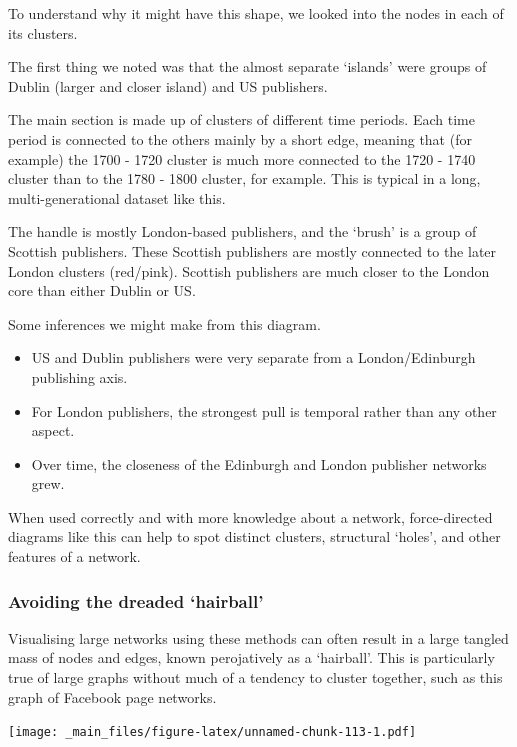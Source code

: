 \documentclass[
]{book}
\begin{document}
To understand why it might have this shape, we looked into the nodes in each of its clusters.

The first thing we noted was that the almost separate `islands' were groups of Dublin (larger and closer island) and US publishers.

The main section is made up of clusters of different time periods. Each time period is connected to the others mainly by a short edge, meaning that (for example) the 1700 - 1720 cluster is much more connected to the 1720 - 1740 cluster than to the 1780 - 1800 cluster, for example. This is typical in a long, multi-generational dataset like this.

The handle is mostly London-based publishers, and the `brush' is a group of Scottish publishers. These Scottish publishers are mostly connected to the later London clusters (red/pink). Scottish publishers are much closer to the London core than either Dublin or US.

Some inferences we might make from this diagram.

\begin{itemize}
\item
  US and Dublin publishers were very separate from a London/Edinburgh publishing axis.
\item
  For London publishers, the strongest pull is temporal rather than any other aspect.
\item
  Over time, the closeness of the Edinburgh and London publisher networks grew.
\end{itemize}

When used correctly and with more knowledge about a network, force-directed diagrams like this can help to spot distinct clusters, structural `holes', and other features of a network.

\hypertarget{avoiding-the-dreaded-hairball}{%
\subsubsection{Avoiding the dreaded `hairball'}\label{avoiding-the-dreaded-hairball}}

Visualising large networks using these methods can often result in a large tangled mass of nodes and edges, known perojatively as a `hairball'. This is particularly true of large graphs without much of a tendency to cluster together, such as this graph of Facebook page networks\citep{musae}.

\texttt{[image: \_main\_files/figure-latex/unnamed-chunk-113-1.pdf]}
\end{document}
